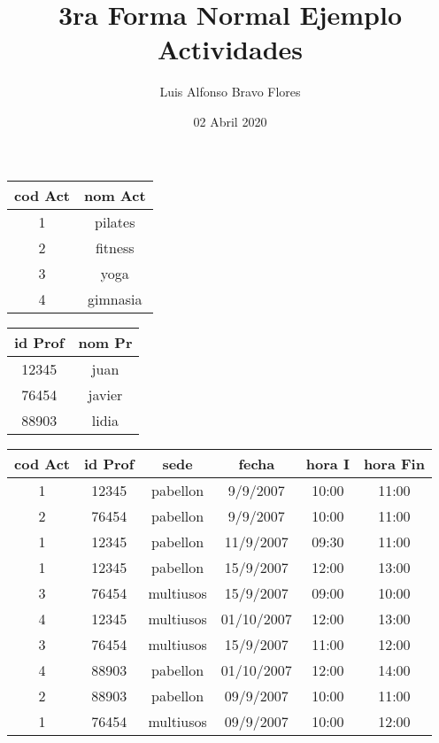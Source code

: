 \documentclass{article}
\title{3ra Forma Normal Ejemplo Actividades}
\author{Luis Alfonso Bravo Flores }
\date{02 Abril 2020}
\begin{document}
\maketitle

\centering

\begin{tabular}{|c|c|}

\hline
cod Act & nom Act \\
\hline
1 & pilates \\
\hline
2 & fitness \\
\hline
3 & yoga \\
\hline
 4 & gimnasia \\
\hline

\end{tabular}


\hspace{2em} 

\centering
\begin{tabular}{|c|c|}

\hline
id Prof & nom Pr \\
\hline
12345 & juan \\
\hline
76454 & javier \\
\hline
88903 & lidia \\
\hline
\end{tabular}




\begin{tabular}{|c|c|c|c|c|c|}

\hline
cod Act & id Prof & sede & fecha & hora I & hora Fin \\
\hline
1 & 12345 & pabellon & 9/9/2007 & 10:00 & 11:00 \\
\hline
2 & 76454 & pabellon & 9/9/2007 & 10:00 & 11:00 \\
\hline
1 & 12345 & pabellon & 11/9/2007 & 09:30 & 11:00 \\
\hline
1 & 12345 & pabellon & 15/9/2007 & 12:00 & 13:00 \\
\hline
3 & 76454 & multiusos & 15/9/2007 & 09:00 & 10:00 \\
\hline
4 & 12345 & multiusos & 01/10/2007 & 12:00 & 13:00 \\
\hline
3 & 76454 & multiusos & 15/9/2007 & 11:00 & 12:00 \\
\hline
4 & 88903 & pabellon & 01/10/2007 & 12:00 & 14:00 \\
\hline
2 & 88903 & pabellon & 09/9/2007 & 10:00 & 11:00 \\
\hline
1 & 76454 & multiusos & 09/9/2007 & 10:00 & 12:00 \\
\hline
\end{tabular}
\end{document}
